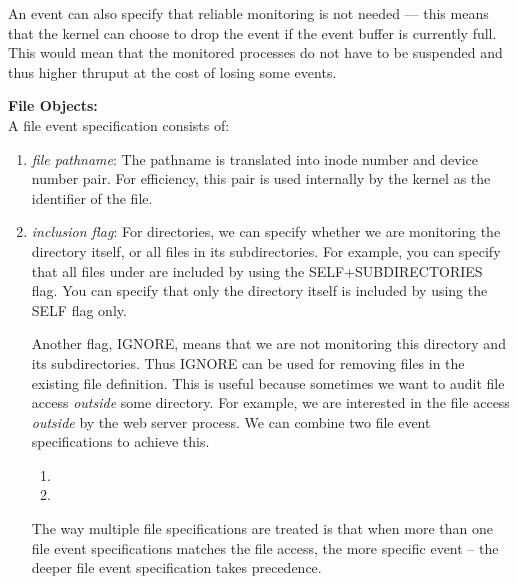 An event can also specify that reliable monitoring is not needed ---
this means that the kernel can choose to drop the event if the 
event buffer is currently full.
This would mean that the monitored processes do not have to be suspended
and thus higher thruput at the cost of losing some events.



\noindent
{\bf File Objects:} \\
A file event specification consists of:
\begin{enumerate}

\item {\em file pathname}:
The pathname is translated into inode number and device number pair.
For efficiency, this pair is used internally by the kernel as
the identifier of the file.

\item {\em inclusion flag}:
For directories, we can specify whether
we are monitoring the directory itself, or all files in its subdirectories.
For example, you can specify that all files under 
are included by using the SELF+SUBDIRECTORIES flag.
You can specify that only the  directory itself
is included by using the SELF flag only.

Another flag, IGNORE, means that we
are not monitoring this directory and its subdirectories.
Thus IGNORE can be used for removing files in the existing file definition.
This is useful because sometimes we want to audit file access
{\em outside} some directory.
For example, we are interested in the file access {\em outside}
 by the web server process.
We can combine two file event specifications to achieve this.
\begin{enumerate}
\item {}
\item {}
\end{enumerate}

The way multiple file specifications are treated is that when
more than one file event specifications matches the file access,
the more specific event -- 
the deeper file event specification takes precedence.


\end{enumerate}
